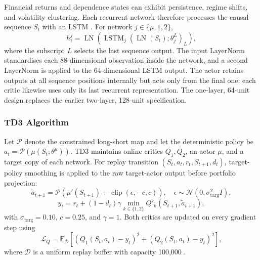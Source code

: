 Financial returns and dependence states can exhibit persistence, regime shifts, and volatility clustering. Each recurrent network therefore processes the causal sequence $S_t$ with an LSTM \cite{hochreiter_long_1997}. For network $j\in\{\mu,1,2\}$,
%
\begin{equation}
h_t^{j}=\operatorname{LN}\!\left(\operatorname{LSTM}_{j}\!\left(\operatorname{LN}(S_t);\theta_j^L\right)_{L}\right),
\label{eq:lstm_encoding}
\end{equation}
%
where the subscript $L$ selects the last sequence output. The input LayerNorm standardises each 88-dimensional observation inside the network, and a second LayerNorm is applied to the 64-dimensional LSTM output. The actor retains outputs at all sequence positions internally but acts only from the final one; each critic likewise uses only its last recurrent representation. The one-layer, 64-unit design replaces the earlier two-layer, 128-unit specification.

\subsubsection{TD3 Algorithm}
\label{subsubsec:3_td3_algorithm}

Let $\mathcal{P}$ denote the constrained long-short map and let the deterministic policy be $a_t=\mathcal{P}(\mu(S_t;\theta^\mu))$. TD3 maintains online critics $Q_1,Q_2$, an actor $\mu$, and a target copy of each network. For replay transition $(S_t,a_t,r_t,S_{t+1},d_t)$, target-policy smoothing is applied to the raw target-actor output before portfolio projection:
%
\begin{equation}
\widetilde a_{t+1}=\mathcal{P}\!\left(\mu'(S_{t+1})+\operatorname{clip}(\epsilon,-c,c)\right), \quad
\epsilon\sim\mathcal{N}(0,\sigma_{\mathrm{targ}}^2I),
\label{eq:td_target1}
\end{equation}
%  
\begin{equation}
y_t=r_t+(1-d_t)\gamma\min_{k\in\{1,2\}}Q'_k(S_{t+1},\widetilde a_{t+1}),
\label{eq:td_target2}
\end{equation}
%
with $\sigma_{\mathrm{targ}}=0.10$, $c=0.25$, and $\gamma=1$. Both critics are updated on every gradient step using
%
\begin{equation}
\mathcal{L}_Q=\mathbb{E}_{\mathcal{D}}\left[(Q_1(S_t,a_t)-y_t)^2+(Q_2(S_t,a_t)-y_t)^2\right],
\label{eq:critic_loss}
\end{equation}
%
where $\mathcal{D}$ is a uniform replay buffer with capacity 100,000 \cite{mnih_human-level_2015}.

